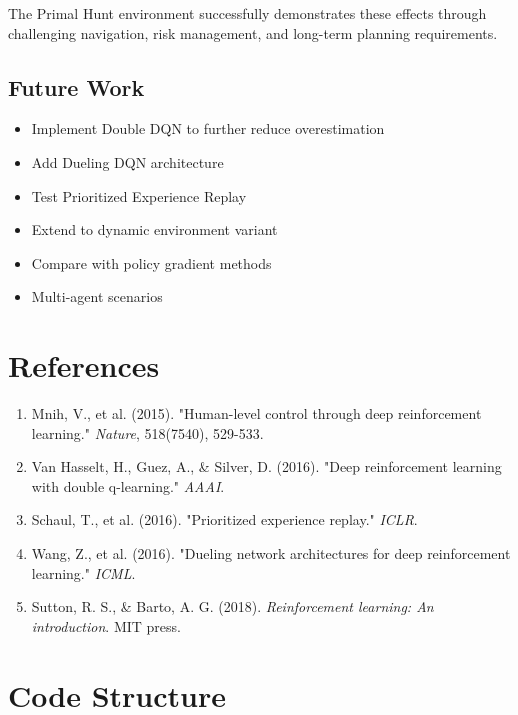 \documentclass[12pt,a4paper]{article}
\begin{document}
The Primal Hunt environment successfully demonstrates these effects through challenging navigation, risk management, and long-term planning requirements.

\subsection{Future Work}

\begin{itemize}
    \item Implement Double DQN to further reduce overestimation
    \item Add Dueling DQN architecture
    \item Test Prioritized Experience Replay
    \item Extend to dynamic environment variant
    \item Compare with policy gradient methods
    \item Multi-agent scenarios
\end{itemize}

\section{References}

\begin{enumerate}
    \item Mnih, V., et al. (2015). "Human-level control through deep reinforcement learning." \textit{Nature}, 518(7540), 529-533.
    
    \item Van Hasselt, H., Guez, A., \& Silver, D. (2016). "Deep reinforcement learning with double q-learning." \textit{AAAI}.
    
    \item Schaul, T., et al. (2016). "Prioritized experience replay." \textit{ICLR}.
    
    \item Wang, Z., et al. (2016). "Dueling network architectures for deep reinforcement learning." \textit{ICML}.
    
    \item Sutton, R. S., \& Barto, A. G. (2018). \textit{Reinforcement learning: An introduction}. MIT press.
\end{enumerate}

\appendix

\section{Code Structure}
\end{document}

